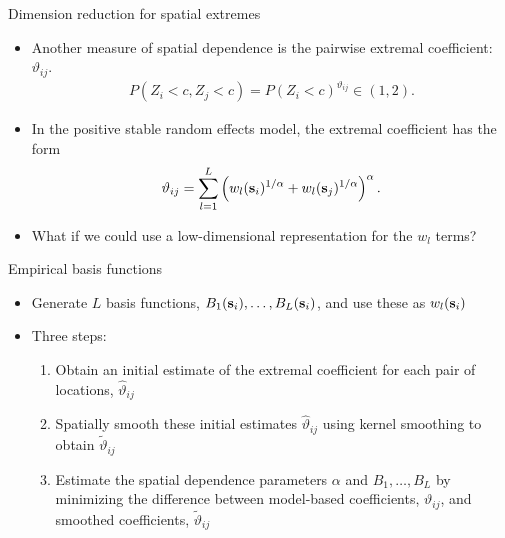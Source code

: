 \documentclass{beamer}
\begin{document}
\begin{frame}{Dimension reduction for spatial extremes}
  \begin{itemize}
    \item Another measure of spatial dependence is the pairwise extremal coefficient: $\vartheta_{ij}$.
    \begin{align*}
      P(Z_{i}<c,Z_{j}<c) = P(Z_{i}<c)^{\vartheta_{ij}} \in (1, 2).
    \end{align*}
    \item In the positive stable random effects model, the extremal coefficient has the form
    \begin{align*}
      \vartheta_{ij} = \sum_{l=1}^L \left(w_{l}(\mbox{\bf s}_i)^{1/\alpha}+w_{l}(\mbox{\bf s}_j)^{1/\alpha}\right)^\alpha.
    \end{align*}
    \item What if we could use a low-dimensional representation for the $w_l$ terms?
  \end{itemize}
\end{frame}

\begin{frame}{Empirical basis functions}
  \begin{itemize} \setlength{\itemsep}{1em}
    \item Generate $L$ basis functions, $B_1(\mbox{\bf s}_i), \ldots, B_L(\mbox{\bf s}_i)$, and use these as $w_l(\mbox{\bf s}_i)$
    \item Three steps:
    \begin{enumerate}[1.] \setlength{\itemsep}{0.5em}
      \item Obtain an initial estimate of the extremal coefficient for each pair of locations, ${\hat \vartheta}_{ij}$
      \item Spatially smooth these initial estimates ${\hat \vartheta}_{ij}$ using kernel smoothing to obtain ${\tilde \vartheta}_{ij}$
      \item Estimate the spatial dependence parameters $\alpha$ and $B_1, \ldots, B_L$ by minimizing the difference between model-based coefficients, $\vartheta_{ij}$, and smoothed coefficients, ${\tilde \vartheta}_{ij}$
    \end{enumerate}
  \end{itemize}
\end{frame}
\end{document}
